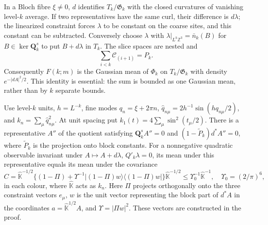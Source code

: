 \documentclass[11pt,letterpaper,reqno]{amsart}
\makeatletter
\theoremstyle{definition}
\newcommand{\ms@minorstart}{%
  \pushQED{\qed}\renewcommand{\qedsymbol}{$\blacksquare$}}
\newenvironment{lemma}[1][]{\ms@minorstart\ms@lemma[#1]}
  {\popQED\endms@lemma}
\theoremstyle{remark}
\makeatother
\begin{document}
In a Bloch fibre $\xi\ne0$, $d$ identifies
$T_k/\mathfrak G_k$ with the closed curvatures of vanishing
level-$k$ average.  If two representatives have the same curl,
their difference is $d\lambda$; the linearized constraint
forces $\lambda$ to be constant on the coarse sites, and this
constant can be subtracted.  Conversely choose $\lambda$ with
$\lambda|_{L^k\mathbb Z^3}=\bar n_k(B)$ for
$B\in\ker\mathbf Q_k^s$ to put $B+d\lambda$ in $T_k$.
The slice spaces are nested and
\[
 \sum_{i<k}\mathcal C_{(i+1)}=P_k.
\]
Consequently $F(k;m)$ is the Gaussian mean of $\Phi_k$ on
$T_k/\mathfrak G_k$ with density $e^{-|dA|^2/2}$.
This identity is essential: the sum is bounded as one Gaussian
mean, rather than by $k$ separate bounds.

\begin{lemma}[The constrained covariance]\label{C-398-11}
Use level-$k$ units, $h=L^{-k}$, fine modes
$q_n=\xi+2\pi n$, $\hat q_{n\mu}=2h^{-1}\sin(hq_{n\mu}/2)$,
and $k_n=\sum_\mu\hat q_{n\mu}^2$.
At unit spacing put $k_1(t)=4\sum_\mu\sin^2(t_\mu/2)$.
There is a representative $A''$ of the quotient satisfying
$\mathbf Q_k^sA''=0$ and $(1-\widetilde P_k)d^*A''=0$,
where $\widetilde P_k$ is the projection onto block constants.
For a nonnegative quadratic observable invariant under
$A\mapsto A+d\lambda$, $Q'_k\lambda=0$, its mean under
this representative equals its mean under the covariance
\[
 \widehat C=\widehat{\mathbb K}^{-1/2}
 \{(1-\Pi)+\Upsilon^{-1}|(1-\Pi)w\rangle
                          \langle(1-\Pi)w|\}
                   \widehat{\mathbb K}^{-1/2}
 \le\Upsilon_0^{-1}\widehat{\mathbb K}^{-1},
 \quad\Upsilon_0=(2/\pi)^6,
\]
in each colour, where $\widehat{\mathbb K}$ acts as $k_n$.
Here $\Pi$ projects orthogonally onto the three constraint
vectors $e_\mu$, $w$ is the unit vector representing the block
part of $d^*A$ in the coordinates
$a=\widehat{\mathbb K}^{1/2}A$, and $\Upsilon=|\Pi w|^2$.
These vectors are constructed in the proof.
\end{lemma}
\end{document}
